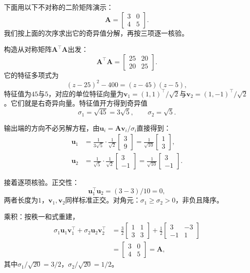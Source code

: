 \begin{example}[二阶矩阵的奇异值分解与核验]
\label{ex:svd-two-by-two-check}
下面用以下不对称的二阶矩阵演示：
\[
 \bm A=\begin{bmatrix}3&0\\4&5\end{bmatrix}.
\]
我们按上面的次序求出它的奇异值分解，再按三项逐一核验。

构造从对称矩阵$\bm A^\top\bm A$出发：
\[
 \bm A^\top\bm A=\begin{bmatrix}25&20\\20&25\end{bmatrix}.
\]
它的特征多项式为
\[
 (z-25)^2-400=(z-45)(z-5),
\]
特征值为$45$与$5$，对应的单位特征向量为$\bm v_1=(1,1)^\top/\sqrt2$与$\bm v_2=(1,-1)^\top/\sqrt2$。它们就是右奇异向量。特征值开方得到奇异值
\[
 \sigma_1=\sqrt{45}=3\sqrt5,\qquad\sigma_2=\sqrt5 .
\]

输出端的方向不必另解方程，由$\bm u_i=\bm A\bm v_i/\sigma_i$直接得到：
\[
 \begin{aligned}
 \bm u_1&=\frac{1}{3\sqrt5}\cdot\frac1{\sqrt2}\begin{bmatrix}3\\9\end{bmatrix}=\frac1{\sqrt{10}}\begin{bmatrix}1\\3\end{bmatrix},\\
 \bm u_2&=\frac{1}{\sqrt5}\cdot\frac1{\sqrt2}\begin{bmatrix}3\\-1\end{bmatrix}=\frac1{\sqrt{10}}\begin{bmatrix}3\\-1\end{bmatrix}.
 \end{aligned}
\]

接着逐项核验。正交性：
\[
 \bm u_1^\top\bm u_2=(3-3)/10=0 ,
\]
两者长度为$1$，$\bm v_1,\bm v_2$同样标准正交。对角元：$\sigma_1\geq\sigma_2>0$，非负且降序。

乘积：按秩一和式重建，
\[
 \begin{aligned}
 \sigma_1\bm u_1\bm v_1^\top+\sigma_2\bm u_2\bm v_2^\top
 &=\frac32\begin{bmatrix}1&1\\3&3\end{bmatrix}+\frac12\begin{bmatrix}3&-3\\-1&1\end{bmatrix}\\
 &=\begin{bmatrix}3&0\\4&5\end{bmatrix}=\bm A ,
 \end{aligned}
\]
其中$\sigma_1/\sqrt{20}=3/2$，$\sigma_2/\sqrt{20}=1/2$。


\end{example}
